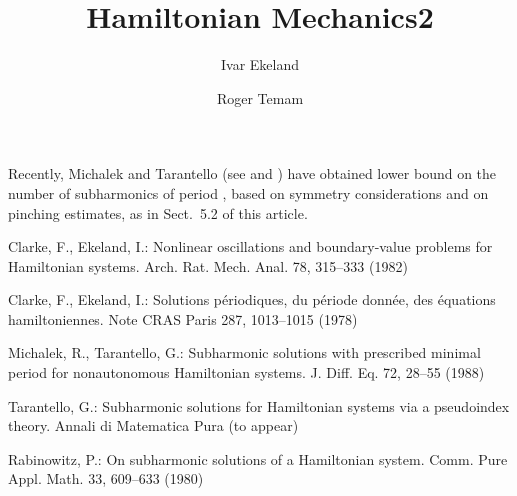\documentclass{llncs}
\begin{document}
Recently, Michalek and Tarantello (see \cite{mich:tar} and \cite{tar})
have obtained lower bound on the number of subharmonics of period ,
based on symmetry considerations and on pinching estimates, as in
Sect.~5.2 of this article.

\begin{thebibliography}{5}
Clarke, F., Ekeland, I.:
Nonlinear oscillations and
boundary-value problems for Hamiltonian systems.
Arch. Rat. Mech. Anal. 78, 315--333 (1982)

Clarke, F., Ekeland, I.:
Solutions p\'{e}riodiques, du
p\'{e}riode donn\'{e}e, des \'{e}quations hamiltoniennes.
Note CRAS Paris 287, 1013--1015 (1978)

Michalek, R., Tarantello, G.:
Subharmonic solutions with prescribed minimal
period for nonautonomous Hamiltonian systems.
J. Diff. Eq. 72, 28--55 (1988)

Tarantello, G.:
Subharmonic solutions for Hamiltonian
systems via a  pseudoindex theory.
Annali di Matematica Pura (to appear)

Rabinowitz, P.:
On subharmonic solutions of a Hamiltonian system.
Comm. Pure Appl. Math. 33, 609--633 (1980)

\end{thebibliography}

\title{Hamiltonian Mechanics2}

\author{Ivar Ekeland \and Roger Temam}

\end{document}
